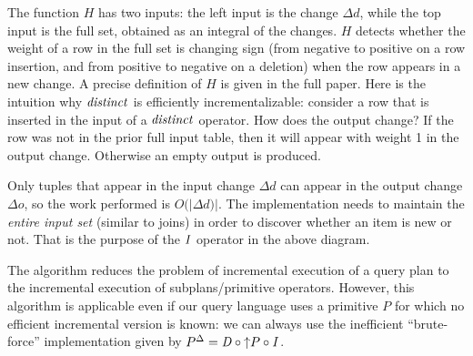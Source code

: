 The function $H$ has two inputs: the left input is the change $\Delta
d$, while the top input is the full set, obtained as an integral of
the changes.  $H$ detects whether the weight of a row in the full set
is changing sign (from negative to positive on a row insertion, and
from positive to negative on a deletion) when the row appears in a new
change.  A precise definition of $H$ is given in the full paper.  Here
is the intuition why $\mathit{distinct}$ is efficiently incrementalizable:
consider a row that is inserted in the input of a $\mathit{distinct}$
operator.  How does the output change?  If the row was not in the
prior full input table, then it will appear with weight 1 in the
output change.  Otherwise an empty output is produced.

Only
tuples that appear in the input change $\Delta d$ can appear in the
output change $\Delta o$, so the work performed is $O(|\Delta d)|$.
The implementation needs to maintain the \emph{entire input set}
(similar to joins) in order to discover whether an item is new or not.
That is the purpose of the $\mathit{I}$ operator in the above diagram.

The algorithm reduces the problem of incremental execution of a query
plan to the incremental execution of subplans/primitive operators.
However, this algorithm is applicable even if our query language uses
a primitive $P$ for which no efficient incremental version is known:
we can always use the inefficient ``brute-force'' implementation given
by ${P}^{\Delta} = \mathit{D} \circ {\uparrow}P \circ \mathit{I}$.




